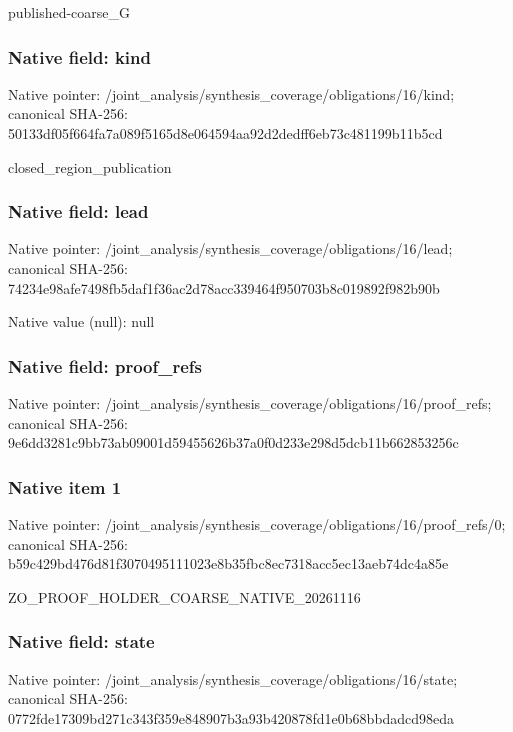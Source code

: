 \documentclass[10pt,a4paper]{article}
\begin{document}
\begingroup\raggedright\sloppy published-coarse\_\allowbreak{}G\par\endgroup

\subsubsection{Native field: kind}
Native pointer: /joint\_\allowbreak{}analysis/synthesis\_\allowbreak{}coverage/obligations/16/kind; canonical SHA-256: 50133df05f664fa7a089f5165d8e064594aa92d2dedff6eb73c481199b11b5cd

\begingroup\raggedright\sloppy closed\_\allowbreak{}region\_\allowbreak{}publication\par\endgroup

\subsubsection{Native field: lead}
Native pointer: /joint\_\allowbreak{}analysis/synthesis\_\allowbreak{}coverage/obligations/16/lead; canonical SHA-256: 74234e98afe7498fb5daf1f36ac2d78acc339464f950703b8c019892f982b90b

Native value (null): null

\subsubsection{Native field: proof\_\allowbreak{}refs}
Native pointer: /joint\_\allowbreak{}analysis/synthesis\_\allowbreak{}coverage/obligations/16/proof\_\allowbreak{}refs; canonical SHA-256: 9e6dd3281c9bb73ab09001d59455626b37a0f0d233e298d5dcb11b662853256c

\subsubsection{Native item 1}
Native pointer: /joint\_\allowbreak{}analysis/synthesis\_\allowbreak{}coverage/obligations/16/proof\_\allowbreak{}refs/0; canonical SHA-256: b59c429bd476d81f3070495111023e8b35fbc8ec7318acc5ec13aeb74dc4a85e

\begingroup\raggedright\sloppy ZO\_\allowbreak{}PROOF\_\allowbreak{}HOLDER\_\allowbreak{}COARSE\_\allowbreak{}NATIVE\_\allowbreak{}20261116\par\endgroup

\subsubsection{Native field: state}
Native pointer: /joint\_\allowbreak{}analysis/synthesis\_\allowbreak{}coverage/obligations/16/state; canonical SHA-256: 0772fde17309bd271c343f359e848907b3a93b420878fd1e0b68bbdadcd98eda
\end{document}
